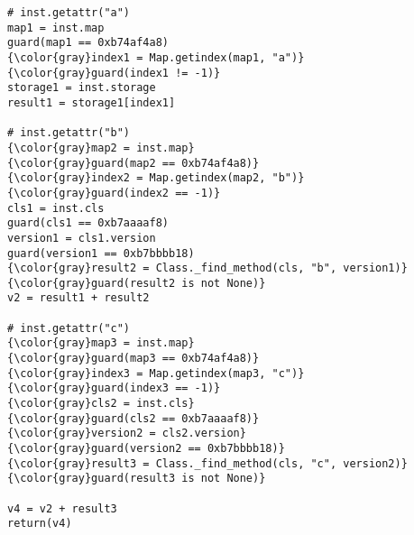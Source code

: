 \begin{Verbatim}[commandchars=\\\{\}]
# inst.getattr("a")
map1 = inst.map
guard(map1 == 0xb74af4a8)
{\color{gray}index1 = Map.getindex(map1, "a")}
{\color{gray}guard(index1 != -1)}
storage1 = inst.storage
result1 = storage1[index1]

# inst.getattr("b")
{\color{gray}map2 = inst.map}
{\color{gray}guard(map2 == 0xb74af4a8)}
{\color{gray}index2 = Map.getindex(map2, "b")}
{\color{gray}guard(index2 == -1)}
cls1 = inst.cls
guard(cls1 == 0xb7aaaaf8)
version1 = cls1.version
guard(version1 == 0xb7bbbb18)
{\color{gray}result2 = Class._find_method(cls, "b", version1)}
{\color{gray}guard(result2 is not None)}
v2 = result1 + result2

# inst.getattr("c")
{\color{gray}map3 = inst.map}
{\color{gray}guard(map3 == 0xb74af4a8)}
{\color{gray}index3 = Map.getindex(map3, "c")}
{\color{gray}guard(index3 == -1)}
{\color{gray}cls2 = inst.cls}
{\color{gray}guard(cls2 == 0xb7aaaaf8)}
{\color{gray}version2 = cls2.version}
{\color{gray}guard(version2 == 0xb7bbbb18)}
{\color{gray}result3 = Class._find_method(cls, "c", version2)}
{\color{gray}guard(result3 is not None)}

v4 = v2 + result3
return(v4)
\end{Verbatim}
